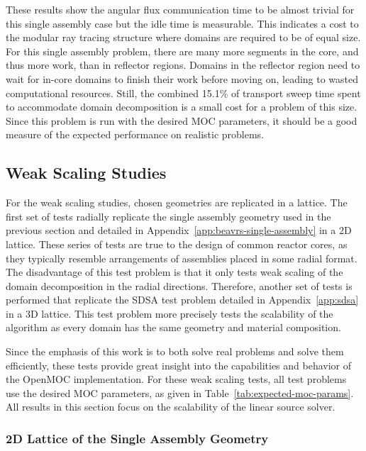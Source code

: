 These results show the angular flux communication time to be almost trivial for this single assembly case but the idle time is measurable. This indicates a cost to the modular ray tracing structure where domains are required to be of equal size. For this single assembly problem, there are many more segments in the core, and thus more work, than in reflector regions. Domains in the reflector region need to wait for in-core domains to finish their work before moving on, leading to wasted computational resources. Still, the combined 15.1\% of transport sweep time spent to accommodate domain decomposition is a small cost for a problem of this size. Since this problem is run with the desired \ac{MOC} parameters, it should be a good measure of the expected performance on realistic problems.

\subsection{Weak Scaling Studies}
\label{sec:dd-weak-scaling}

For the weak scaling studies, chosen geometries are replicated in a lattice. The first set of tests radially replicate the single assembly geometry used in the previous section and detailed in Appendix~\ref{app:beavrs-single-assembly} in a 2D lattice. These series of tests are true to the design of common reactor cores, as they typically resemble arrangements of assemblies placed in some radial format. The disadvantage of this test problem is that it only tests weak scaling of the domain decomposition in the radial directions. Therefore, another set of tests is performed that replicate the SDSA test problem detailed in Appendix~\ref{app:sdsa} in a 3D lattice. This test problem more precisely tests the scalability of the algorithm as every domain has the same geometry and material composition. 

Since the emphasis of this work is to both solve real problems and solve them efficiently, these tests provide great insight into the capabilities and behavior of the OpenMOC implementation. For these weak scaling tests, all test problems use the desired \ac{MOC} parameters, as given in Table~\ref{tab:expected-moc-params}. All results in this section focus on the scalability of the linear source solver.
 

\subsubsection{2D Lattice of the Single Assembly Geometry}

